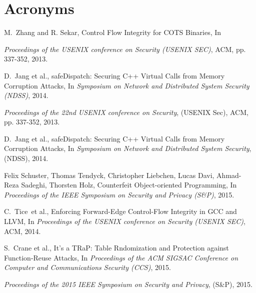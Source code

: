 \documentclass[11pt,a4paper,bibtotoc,idxtotoc,headsepline,footsepline,footexclude,BCOR20mm,DIV10]{scrbook}
\begin{document}
		
		
		
   \chapter*{Acronyms}
   
  
   \listoffigures
   \listoftables
	
  \clearemptydoublepage
  
  
\begin{thebibliography}{50}



M.~Zhang and R. Sekar, {Control Flow Integrity for COTS Binaries}, In

\emph{Proceedings of the USENIX conference on Security (USENIX SEC)}, ACM, pp. 337-352, 2013.

D.~Jang et al., {safeDispatch: Securing C++ Virtual Calls from Memory Corruption Attacks}, In
\emph{Symposium on Network and Distributed System Security (NDSS)}, 2014.

\emph{Proceedings of the 22nd USENIX conference on Security}, (USENIX Sec), ACM, pp. 337-352, 2013.

D.~Jang et al., {safeDispatch: Securing C++ Virtual Calls from Memory Corruption Attacks}, In
\emph{Symposium on Network and Distributed System Security}, (NDSS), 2014.

Felix Schuster, Thomas Tendyck, Christopher Liebchen, Lucas Davi, Ahmad-Reza Sadeghi, Thorsten Holz, 
{Counterfeit Object-oriented Programming}, In
\emph{Proceedings of the IEEE Symposium on Security and Privacy (S\&P)}, 2015.

C.~Tice~et al., {Enforcing Forward-Edge Control-Flow Integrity in GCC and LLVM}, In
\emph{Proceedings of the USENIX conference on Security (USENIX SEC)}, ACM, 2014.

S.~Crane et al., {It's a TRaP: Table Rndomization and Protection against Function-Reuse Attacks}, In
\emph{Proceedings of the ACM SIGSAC Conference on Computer and Communications Security (CCS)}, 2015.

\emph{Proceedings of the 2015 IEEE Symposium on Security and Privacy}, (S\&P), 2015.


\end{thebibliography}
\end{document}
